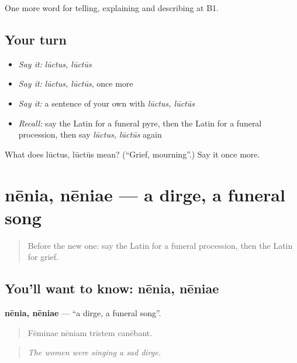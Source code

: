 \begin{grammarlens}[title={What you've built}]
One more word for telling, explaining and describing at B1.
\end{grammarlens}

\subsection*{Your turn}
\begin{itemize}
\raggedright
  \item \emph{Say it:} \emph{lūctus, lūctūs}
  \item \emph{Say it:} \emph{lūctus, lūctūs}, once more
  \item \emph{Say it:} a sentence of your own with \emph{lūctus, lūctūs}
  \item \emph{Recall:} say the Latin for a funeral pyre, then the Latin for a funeral procession, then say \emph{lūctus, lūctūs} again
\end{itemize}

\begin{tcolorbox}[breakable,colback=teal!4,colframe=teal!35!black,title={Before you move on}]
What does lūctus, lūctūs mean? (\textquotedblleft{}Grief, mourning\textquotedblright{}.) Say it once more.
\end{tcolorbox}
\section[nēnia, nēniae]{nēnia, nēniae — a dirge, a funeral song}

\label{lesson:LA-C331-nenia}



\begin{quote}
Before the new one: say the Latin for a funeral procession, then the Latin for grief.
\end{quote}

\subsection*{You'll want to know: nēnia, nēniae}
\textbf{nēnia, nēniae} — \textquotedblleft{}a dirge, a funeral song\textquotedblright{}.

\begin{quote}
Fēminae nēniam trīstem canēbant.
\end{quote}

\begin{quote}
\emph{The women were singing a sad dirge.}
\end{quote}


